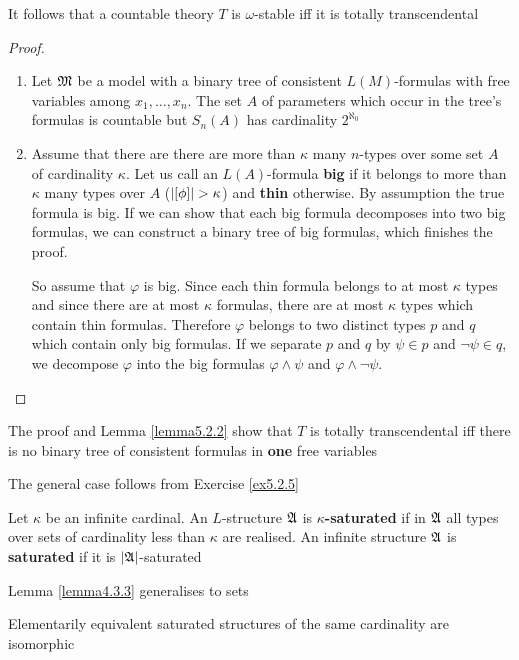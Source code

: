 \documentclass[11pt]{article}
\begin{document}
It follows that a countable theory \(T\) is \(\omega\)-stable iff it is totally transcendental

\begin{proof}
\begin{enumerate}
\item Let \(\mathfrak{M}\) be a model with a binary tree of consistent \(L(M)\)-formulas with free variables
among \(x_1,\dots,x_n\). The set \(A\) of parameters which occur in the tree's formulas is
countable but \(S_n(A)\) has cardinality \(2^{\aleph_0}\)
\item Assume that there are there are more than \(\kappa\) many \(n\)-types over some set \(A\) of
cardinality \(\kappa\). Let us call an \(L(A)\)-formula \textbf{big} if it belongs to more than \(\kappa\) many types
over \(A\) (\(\abs{[\phi]}>\kappa\)) and \textbf{thin} otherwise. By assumption the true formula is big. If we
can show that each big formula decomposes into two big formulas, we can construct a binary
tree of big formulas, which finishes the proof.

So assume that \(\varphi\) is big. Since each thin formula belongs to at most \(\kappa\) types and since there
are at most \(\kappa\) formulas, there are at most \(\kappa\) types which contain thin formulas. Therefore
\(\varphi\) belongs to two distinct types \(p\) and \(q\) which contain only big formulas. If we
separate \(p\) and \(q\) by \(\psi\in p\) and \(\neg\psi\in q\), we decompose \(\varphi\) into the big
formulas \(\varphi\wedge\psi\) and \(\varphi\wedge\neg\psi\).
\end{enumerate}
\end{proof}

The proof and Lemma \ref{lemma5.2.2} show that \(T\) is totally transcendental iff there is no
binary tree of consistent formulas in \textbf{one} free variables

The general case follows from Exercise \ref{ex5.2.5}

\begin{definition}[]
Let \(\kappa\) be an infinite cardinal. An \(L\)-structure \(\mathfrak{A}\) is \textbf{\(\kappa\)-saturated} if in \(\mathfrak{A}\) all
types over sets of cardinality less than \(\kappa\) are realised. An infinite structure \(\mathfrak{A}\) is \textbf{saturated}
if it is \(\abs{\fA}\)-saturated
\end{definition}

Lemma \ref{lemma4.3.3} generalises to sets

\begin{lemma}[]
\label{lemma5.2.8}
Elementarily equivalent saturated structures of the same cardinality are isomorphic
\end{lemma}
\end{document}
